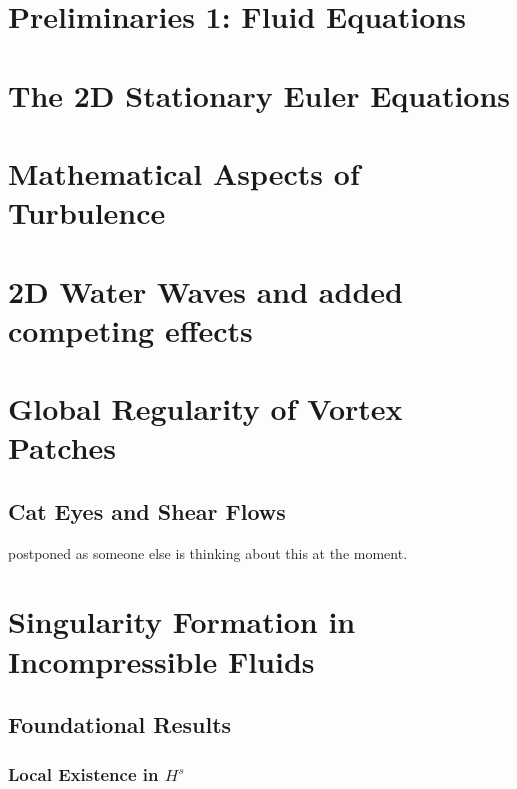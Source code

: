


\rhead{\today} 

\chapter{Preliminaries 1: Fluid Equations}



\chapter{The 2D Stationary Euler Equations}



\chapter{Mathematical Aspects of Turbulence}



\chapter{2D Water Waves and added competing effects}



\chapter{Global Regularity of Vortex Patches}

\section{Cat Eyes and Shear Flows}

postponed as someone else is thinking about this at the moment.

\chapter{Singularity Formation in Incompressible Fluids}

\section{Foundational Results}

\subsection{Local Existence in $H^s$}

